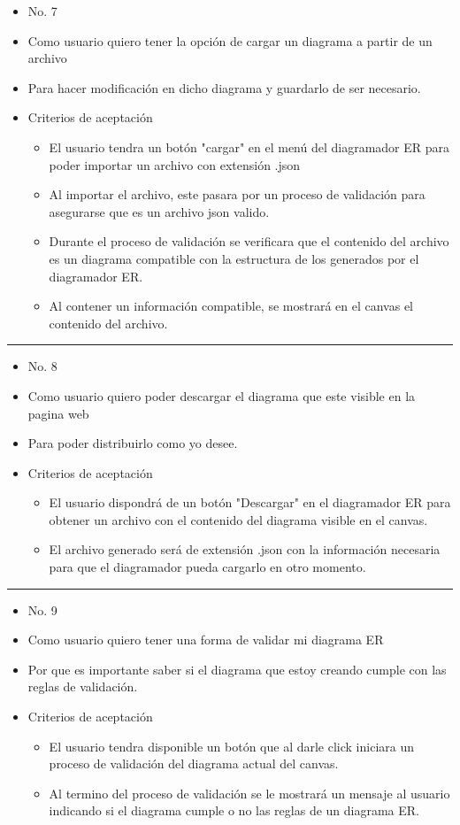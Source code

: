 \begin{itemize}
	\item No. 7
	\item Como usuario quiero tener la opción de cargar un diagrama a partir de un archivo
	\item Para hacer modificación en dicho diagrama y guardarlo de ser necesario.
	\item Criterios de aceptación
	\begin{itemize}
		\item El usuario tendra un botón "cargar" en el menú del diagramador ER para poder importar un archivo con extensión .json
		\item Al importar el archivo, este pasara por un proceso de validación para asegurarse que es un archivo json valido.
		\item Durante el proceso de validación se verificara que el contenido del archivo es un diagrama compatible con la estructura de los generados por el diagramador ER.
		\item Al contener un información compatible, se mostrará en el canvas el contenido del archivo.
	\end{itemize}
\end{itemize}
\noindent\rule{\textwidth}{1pt}
\begin{itemize}
	\item No. 8
	\item Como usuario quiero poder descargar el diagrama que este visible en la pagina web
	\item Para poder distribuirlo como yo desee.
	\item Criterios de aceptación
	\begin{itemize}
		\item El usuario dispondrá de un botón "Descargar" en el diagramador ER para obtener un archivo con el contenido del diagrama visible en el canvas.
		\item El archivo generado será de extensión .json con la información necesaria para que el diagramador pueda cargarlo en otro momento.
	\end{itemize}
\end{itemize}
\noindent\rule{\textwidth}{1pt}
\begin{itemize}
	\item No. 9
	\item Como usuario quiero tener una forma de validar mi diagrama ER
	\item Por que es importante saber si el diagrama que estoy creando cumple con las reglas de validación.
	\item Criterios de aceptación
	\begin{itemize}
		\item El usuario tendra disponible un botón que al darle click iniciara un proceso de validación del diagrama actual del canvas.
		\item Al termino del proceso de validación se le mostrará un mensaje al usuario indicando si el diagrama cumple o no las reglas de un diagrama ER.
	\end{itemize}
\end{itemize}
